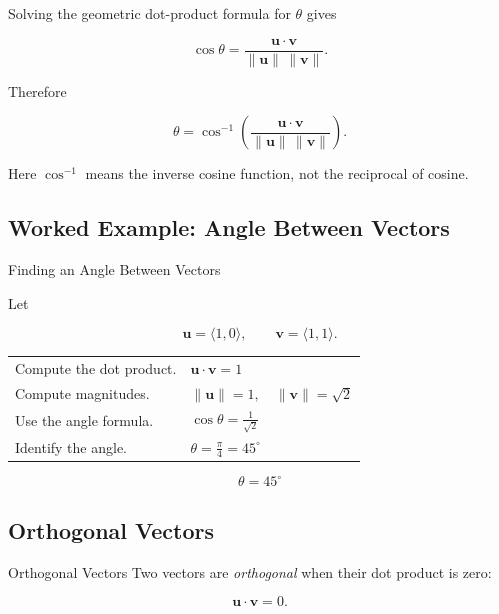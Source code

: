 Solving the geometric dot-product formula for \(\theta\) gives

\[
\boxed{
\cos\theta
=
\frac{\mathbf{u}\cdot\mathbf{v}}
{\|\mathbf{u}\|\,\|\mathbf{v}\|}.
}
\]

Therefore

\[
\boxed{
\theta
=
\cos^{-1}
\left(
\frac{\mathbf{u}\cdot\mathbf{v}}
{\|\mathbf{u}\|\,\|\mathbf{v}\|}
\right).
}
\]

Here \(\cos^{-1}\) means the inverse cosine function, not the reciprocal of
cosine.

\subsection{Worked Example: Angle Between Vectors}
\label{subsec:worked-angle-between-vectors}

\begin{workedexamplebox}{Finding an Angle Between Vectors}

Let

\[ \mathbf{u}=\langle1,0\rangle,\qquad
\mathbf{v}=\langle1,1\rangle. \]

\begin{tabularx}{\textwidth}{@{}>{\raggedright\arraybackslash}p{}X@{}}
Compute the dot product. &
\(\mathbf{u}\cdot\mathbf{v}=1\)\\
Compute magnitudes. &
\(\|\mathbf{u}\|=1,\quad\|\mathbf{v}\|=\sqrt2\)\\
Use the angle formula. &
\(\cos\theta=\frac{1}{\sqrt2}\)\\
Identify the angle. &
\(\theta=\frac{\pi}{4}=45^\circ\)
\end{tabularx}

\begin{answerbox}
\[ \boxed{\theta=45^\circ} \]
\end{answerbox}
\end{workedexamplebox}

\subsection{Orthogonal Vectors}
\label{subsec:orthogonal-vectors}

\begin{definitionbox}{Orthogonal Vectors}
Two vectors are \emph{orthogonal} when their dot product is zero:

\[ \boxed{\mathbf{u}\cdot\mathbf{v}=0.} \]
\end{definitionbox}

